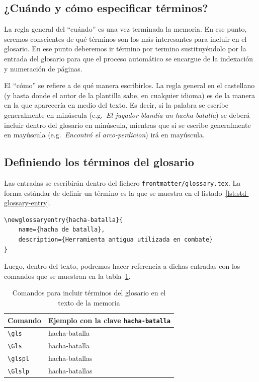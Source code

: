 \documentclass[%
    school=etsisi,%
    type=pfg,%
    degree=61CD,%
]{upm-report}
\begin{document}
\subsection{¿Cuándo y cómo especificar términos?}

La regla general del \enquote{cuándo} es una vez terminada la memoria. En ese punto, seremos conscientes de qué términos son los más interesantes para incluir en el glosario. En ese punto deberemos ir término por termino sustituyéndolo por la entrada del glosario para que el proceso automático se encargue de la indexación y numeración de páginas.

El \enquote{cómo} se refiere a de qué manera escribirlos. La regla general en el castellano (y hasta donde el autor de la plantilla sabe, en cualquier idioma) es de la manera en la que aparecería en medio del texto. Es decir, si la palabra se escribe generalmente en minúscula (e.g.~\textit{El jugador blandía un \gls{hacha-batalla}}) se deberá incluir dentro del glosario en minúscula, mientras que si se escribe generalmente en mayúscula (e.g.~\textit{Encontró el \gls{arco-perdicion}}) irá en mayúscula.

\subsection{Definiendo los términos del glosario}

Las entradas se escribirán dentro del fichero \texttt{frontmatter/glossary.tex}. La forma estándar de definir un término es la que se muestra en el listado~\ref{lst:std-glossary-entry}.

\begin{lstlisting}[language={[latex]TeX},caption=Código para crear una entrada en el glosario,label=lst:std-glossary-entry]
\newglossaryentry{hacha-batalla}{
    name={hacha de batalla},
    description={Herramienta antigua utilizada en combate}
}
\end{lstlisting}

Luego, dentro del texto, podremos hacer referencia a dichas entradas con los comandos que se muestran en la tabla~\ref{tab:glossary-commands}.

\begin{table}
    \caption{\label{tab:glossary-commands}Comandos para incluir términos del glosario en el texto de la memoria}
    \begin{tabularx}{\textwidth}{@{}lX@{}}
        \toprule
        \textbf{Comando} & \textbf{Ejemplo con la clave \texttt{hacha-batalla}} \\
        \midrule
        \texttt{\textbackslash gls} & \gls{hacha-batalla} \\
        \texttt{\textbackslash Gls} & \Gls{hacha-batalla} \\
        \texttt{\textbackslash glspl} & \glspl{hacha-batalla} \\
        \texttt{\textbackslash Glslp} & \Glspl{hacha-batalla} \\
        \bottomrule
    \end{tabularx}
\end{table}
\end{document}
